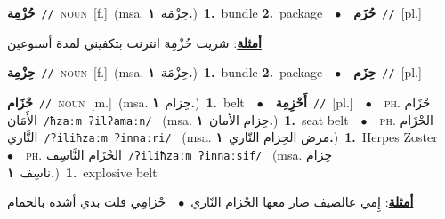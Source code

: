 \documentclass[10pt,a4paper,twoside]{article} %
\begin{document}
\begin{multicols}{2}
{\setlength\topsep{0pt}\textbf{\foreignlanguage{arabic}{حُزْمِة}}\ {\color{gray}\texttt{//}\color{black}}\ \textsc{noun}\ [f.]\ \color{gray}(msa. \foreignlanguage{arabic}{حِزْمَة}~\foreignlanguage{arabic}{\textbf{١.}})\color{black}\ \textbf{1.}~bundle  \textbf{2.}~package\ \ $\bullet$\ \ \setlength\topsep{0pt}\textbf{\foreignlanguage{arabic}{حُزَم}}\ {\color{gray}\texttt{//}\color{black}}\ [pl.]\  \begin{flushright}\color{gray}\foreignlanguage{arabic}{\textbf{\underline{\foreignlanguage{arabic}{أمثلة}}}: شريت حُزْمِة انترنت بتكفيني لمدة أسبوعين}\end{flushright}\color{black}} \vspace{2mm}

{\setlength\topsep{0pt}\textbf{\foreignlanguage{arabic}{حِزْمِة}}\ {\color{gray}\texttt{//}\color{black}}\ \textsc{noun}\ [f.]\ \color{gray}(msa. \foreignlanguage{arabic}{حِزْمَة}~\foreignlanguage{arabic}{\textbf{١.}})\color{black}\ \textbf{1.}~bundle  \textbf{2.}~package\ \ $\bullet$\ \ \setlength\topsep{0pt}\textbf{\foreignlanguage{arabic}{حِزَم}}\ {\color{gray}\texttt{//}\color{black}}\ [pl.]\ } \vspace{2mm}

{\setlength\topsep{0pt}\textbf{\foreignlanguage{arabic}{حْزَام}}\ {\color{gray}\texttt{//}\color{black}}\ \textsc{noun}\ [m.]\ \color{gray}(msa. \foreignlanguage{arabic}{حِزام}~\foreignlanguage{arabic}{\textbf{١.}})\color{black}\ \textbf{1.}~belt\ \ $\bullet$\ \ \setlength\topsep{0pt}\textbf{\foreignlanguage{arabic}{أَحْزِمِة}}\ {\color{gray}\texttt{//}\color{black}}\ [pl.]\ \ $\bullet$\ \ \textsc{ph.} \color{gray} \foreignlanguage{arabic}{حْزَام الأَمَان}\color{black}\ {\color{gray}\texttt{/{\sffamily ħzaːm ʔilʔamaːn}/}\color{black}}\ \color{gray} (msa. \foreignlanguage{arabic}{حِزام الأمان}~\foreignlanguage{arabic}{\textbf{١.}})\color{black}\ \textbf{1.}~seat belt\ \ $\bullet$\ \ \textsc{ph.} \color{gray} \foreignlanguage{arabic}{الحْزَام النَّاري}\color{black}\ {\color{gray}\texttt{/{\sffamily ʔiliħzaːm ʔinnaːri}/}\color{black}}\ \color{gray} (msa. \foreignlanguage{arabic}{مرض الحِزام النّاري}~\foreignlanguage{arabic}{\textbf{١.}})\color{black}\ \textbf{1.}~Herpes Zoster\ \ $\bullet$\ \ \textsc{ph.} \color{gray} \foreignlanguage{arabic}{الحْزَام النَّاسِف}\color{black}\ {\color{gray}\texttt{/{\sffamily ʔiliħzaːm ʔinnaːsif}/}\color{black}}\ \color{gray} (msa. \foreignlanguage{arabic}{حِزام ناسِف}~\foreignlanguage{arabic}{\textbf{١.}})\color{black}\ \textbf{1.}~explosive belt\  \begin{flushright}\color{gray}\foreignlanguage{arabic}{\textbf{\underline{\foreignlanguage{arabic}{أمثلة}}}: إِمي عالصيف صار معها الحْزام النّاري\ $\bullet$\ \  حْزامِي فلت بدي أشده بالحمام}\end{flushright}\color{black}} \vspace{2mm}


\end{multicols}
\end{document}
